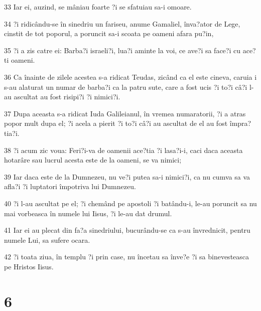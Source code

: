 \par 33 Iar ei, auzind, se mâniau foarte ?i se sfatuiau sa-i omoare.
\par 34 ?i ridicându-se în sinedriu un fariseu, anume Gamaliel, înva?ator de Lege, cinstit de tot poporul, a poruncit sa-i scoata pe oameni afara pu?in,
\par 35 ?i a zis catre ei: Barba?i israeli?i, lua?i aminte la voi, ce ave?i sa face?i cu ace?ti oameni.
\par 36 Ca înainte de zilele acestea s-a ridicat Teudas, zicând ca el este cineva, caruia i s-au alaturat un numar de barba?i ca la patru sute, care a fost ucis ?i to?i câ?i l-au ascultat au fost risipi?i ?i nimici?i.
\par 37 Dupa aceasta s-a ridicat Iuda Galileianul, în vremea numaratorii, ?i a atras popor mult dupa el; ?i acela a pierit ?i to?i câ?i au ascultat de el au fost împra?tia?i.
\par 38 ?i acum zic voua: Feri?i-va de oamenii ace?tia ?i lasa?i-i, caci daca aceasta hotarâre sau lucrul acesta este de la oameni, se va nimici;
\par 39 Iar daca este de la Dumnezeu, nu ve?i putea sa-i nimici?i, ca nu cumva sa va afla?i ?i luptatori împotriva lui Dumnezeu.
\par 40 ?i l-au ascultat pe el; ?i chemând pe apostoli ?i batându-i, le-au poruncit sa nu mai vorbeasca în numele lui Iisus, ?i le-au dat drumul.
\par 41 Iar ei au plecat din fa?a sinedriului, bucurându-se ca s-au învrednicit, pentru numele Lui, sa sufere ocara.
\par 42 ?i toata ziua, în templu ?i prin case, nu încetau sa înve?e ?i sa binevesteasca pe Hristos Iisus.

\chapter{6}

